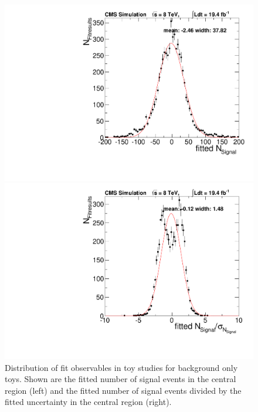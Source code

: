 \begin{figure}[hbp]
  \centering
  \begin{minipage}[t]{0.49\textwidth}
    \includegraphics[width=\textwidth]{plots/results/fit/nSPure_backgroundOnly_m040.pdf}
  \end{minipage}
  \begin{minipage}[t]{0.49\textwidth}
    \includegraphics[width=\textwidth]{plots/results/fit/nS_backgroundOnly_m040.pdf}
  \end{minipage}

  \caption{Distribution of fit observables in toy studies for background only toys. Shown are the fitted number of signal events in the central region (left) and the fitted number of signal events divided by the fitted uncertainty in the central region (right).}
  \label{fig:toys:backgroundOnly}
\end{figure}
